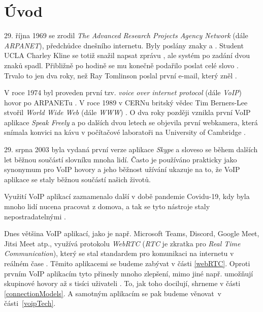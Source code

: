\section{Úvod}

29. října 1969 se zrodil \textit{The Advanced Research Projects Agency Network}
(dále \textit{ARPANET}), předchůdce dnešního internetu. Byly poslány znaky
 a . Student UCLA Charley Kline se totiž snažil napsat zprávu
, ale systém po zadání dvou znaků spadl. Přibližně po hodině se mu
konečně podařilo poslat celé slovo
\cite{PBS-SimpleHelloFirstMessageOverARPANET}. Trvalo to jen dva roky, než Ray
Tomlinson poslal první e-mail, který zněl 
\cite{YahooFinance-SimpleHelloFirstMessageOverARPANET}.

V roce 1974 byl proveden první tzv. \textit{voice over internet protocol} (dále
\textit{VoIP}) hovor po ARPANETu
\cite{DigiFone-WhatYouMightNotKnowAboutTheHistoryOfVoIP}. V roce 1989 v CERNu
britský vědec Tim Berners-Lee stvořil \textit{World Wide Web} (dále
\textit{WWW}) \cite{CERN-TheBirthOfTheWeb}. O dva roky později vznikla první
VoIP aplikace \textit{Speak Freely}
\cite{DigiFone-WhatYouMightNotKnowAboutTheHistoryOfVoIP} a po dalších dvou
letech se objevila první webkamera, která snímala konvici na kávu v počítačové
laboratoři na University of Cambridge \cite{BBC-FirstWebcamMadeCoffeePotFamous}.

29. srpna 2003 byla vydaná první verze aplikace \textit{Skype}
\cite{ArsTechnica-TheStrangeStoryOfSkype} a sloveso  se během
dalších let běžnou součástí slovníku mnoha lidí. Často je používáno prakticky
jako synonymum pro VoIP hovory a jeho běžnost užívání ukazuje na to, že VoIP
aplikace se staly běžnou součástí našich životů.

Využití VoIP aplikací zaznamenalo další  v době pandemie Covidu-19, kdy
byla mnoho lidí nucena pracovat z domova, a tak se tyto nástroje staly
nepostradatelnými \cite{OnSIP-VoIPStatsTrendsCovidImpact}.

Dnes většina VoIP aplikací, jako je např. Microsoft Teams, Discord, Google Meet,
Jitsi Meet atp., využívá protokolu \textit{WebRTC} (\textit{RTC} je zkratka pro
\textit{Real Time Communication}), který se stal standardem pro komunikaci na
internetu v reálném čase \cite{LevelUp-WhatPowerMeetAndTeams,
	Discord-HowDoesItHandleMillionsOfUsers, Jitsi-Projects, WebRTCORG-Homepage}.
Těmito aplikacemi se budeme zabývat v části \ref{webRTC}. Oproti prvním VoIP
aplikacím tyto přinesly mnoho zlepšení, mimo jiné např. umožňují skupinové
hovory až s tisíci uživateli \cite{MicrosoftLearn-MSTeamsLimitsAndSpecs}. To,
jak toho docilují, shrneme v části \ref{connectionModels}. A samotným aplikacím
se pak budeme věnovat~v části~\ref{voipTech}.

